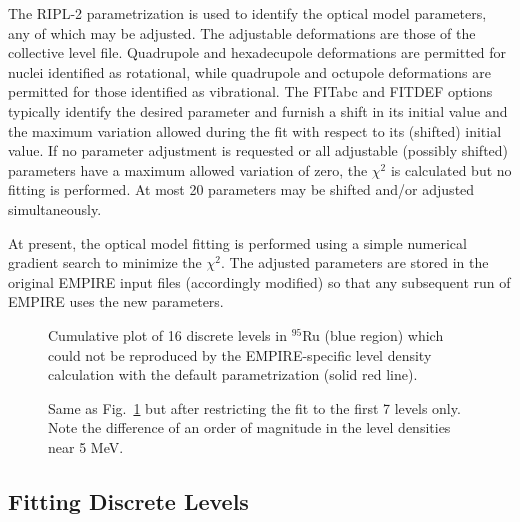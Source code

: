The RIPL-2 parametrization is used to identify the optical model parameters,
any of which may be adjusted. The adjustable deformations are those
of the collective level file. Quadrupole and hexadecupole deformations are
permitted for nuclei identified as rotational, while quadrupole and octupole
deformations are permitted for those identified as vibrational. The FITabc
and FITDEF options typically identify the desired parameter and furnish a
shift in its initial value and the maximum variation allowed during the fit
with respect to its (shifted) initial value. If no parameter adjustment is
requested or all adjustable (possibly shifted) parameters have a maximum
allowed variation of zero, the $\chi^{2}$ is calculated but no fitting is
performed. At most 20 parameters may be shifted and/or adjusted
simultaneously.

At present, the optical model fitting is performed using a simple numerical
gradient search to minimize the $\chi^{2}$. The adjusted parameters are
stored in the original EMPIRE input files (accordingly modified) so that any
subsequent run of EMPIRE uses the new parameters.

\begin{figure}[tbp]
\caption{Cumulative plot of 16 discrete levels in $^{95}$Ru (blue region)
which could not be reproduced by the EMPIRE-specific level density
calculation with the default parametrization (solid red line).}
\label{fig: badfit}
\end{figure}

\begin{figure}[tbp]
\caption{Same as Fig.~\protect\ref{fig: badfit} but after restricting the
fit to the first 7 levels only. Note the difference of an order of magnitude
in the level densities near 5 MeV.}
\label{fig: goodfit}
\end{figure}

\subsection{Fitting Discrete Levels}

